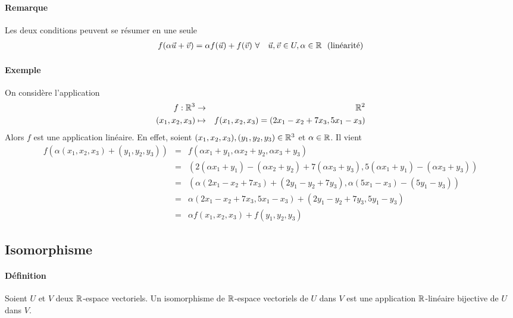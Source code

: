 \paragraph{Remarque} Les deux conditions peuvent se résumer en une seule
  \begin{eqnarray*}
    f(\alpha \vec{u} + \vec{v}) = \alpha f(\vec{u}) + f(\vec{v}) ~ &\forall&\vec{u}, \vec{v} \in U, \alpha \in \mathbb{R} \mbox{~ (linéarité)}
  \end{eqnarray*}

\paragraph{Exemple} On considère l'application 
\begin{eqnarray*}
  f: \mathbb{R}^3 &\rightarrow& \mathbb{R}^2 \\
  (x_1, x_2, x_3) &\mapsto& f(x_1, x_2, x_3) = (2 x_1 - x_2 + 7 x_3, 5 x_1 - x_3)
\end{eqnarray*}
Alors $f$ est une application linéaire. En effet, soient $(x_1, x_2, x_3), (y_1, y_2, y_3) \in \mathbb{R}^3$ et $\alpha \in \mathbb{R}$. Il vient
\begin{eqnarray*}
  f(\alpha (x_1, x_2, x_3) + (y_1, y_2, y_3)) &=& f(\alpha x_1 + y_1, \alpha x_2 + y_2, \alpha x_3 + y_3) \\
    &=& (2 (\alpha x_1 + y_1) - (\alpha x_2 + y_2) + 7 (\alpha x_3 + y_3), 5 (\alpha x_1 + y_1) - (\alpha x_3 + y_3)) \\
    &=& (\alpha (2 x_1 - x_2 + 7 x_3) + (2 y_1 - y_2 + 7 y_3), \alpha(5 x_1 - x_3) - (5 y_1 - y_3)) \\
    &=& \alpha (2 x_1 - x_2 + 7 x_3, 5 x_1 - x_3) + (2 y_1 - y_2 + 7 y_3, 5 y_1 - y_3) \\
    &=& \alpha f(x_1, x_2, x_3) + f(y_1, y_2, y_3)
\end{eqnarray*}


%
\subsection{Isomorphisme}
%
\paragraph{Définition} Soient $U$ et $V$ deux $\mathbb{R}$-espace vectoriels. Un isomorphisme de $\mathbb{R}$-espace vectoriels de $U$ dans $V$ est une application $\mathbb{R}$-linéaire bijective de $U$ dans $V$. 

